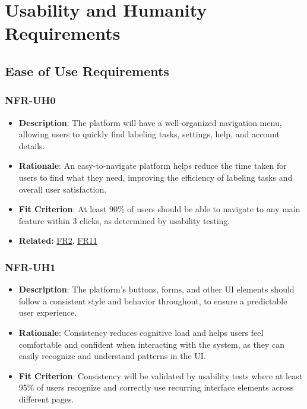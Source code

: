 \documentclass[12pt]{article}
\begin{document}
\section{Usability and Humanity Requirements}

\subsection{Ease of Use Requirements}



\subsubsection*{NFR-UH0}
\label{sec:UH0}
      \begin{itemize}
          \item \textbf{Description}: The platform will have a well-organized navigation menu, allowing users to quickly find labeling tasks, settings, help, and account details.  
          \item \textbf{Rationale}: An easy-to-navigate platform helps reduce the time taken for users to find what they need, improving the efficiency of labeling tasks and overall user satisfaction.  
          \item \textbf{Fit Criterion}: At least 90\% of users should be able to navigate to any main feature within 3 clicks, as determined by usability testing.
          \item \textbf{Related:} \hyperref[sec:FR2]{FR2}, \hyperref[sec:FR11]{FR11}
      \end{itemize}
\subsubsection*{NFR-UH1}
\label{sec:UH1}
      \begin{itemize}
          \item \textbf{Description}: The platform’s buttons, forms, and other UI elements should follow a consistent style and behavior throughout, to ensure a predictable user experience.  
          \item \textbf{Rationale}: Consistency reduces cognitive load and helps users feel comfortable and confident when interacting with the system, as they can easily recognize and understand patterns in the UI.  
          \item \textbf{Fit Criterion}: Consistency will be validated by usability tests where at least 95\% of users recognize and correctly use recurring interface elements across different pages.
      \end{itemize}
\end{document}
